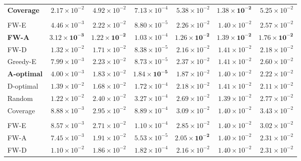\documentclass[letterpaper, 9
 pt, conference]{ieeeconf}
\begin{document}
\begin{table}[ht]
\begin{tabular}{lrrrrrr}
\textbf{Coverage} & $2.17\!\times\!10^{-2}$ & $4.92\!\times\!10^{-2}$ & $7.13\!\times\!10^{-4}$ & $5.38\!\times\!10^{-2}$ & $\mathbf{1.38\!\times\!10^{-2}}$ & $5.25\!\times\!10^{-2}$ \\
\addlinespace[1pt]
\multicolumn{7}{l}{\textit{$K{=}30$}} \\[1pt]
FW-E & $4.46\!\times\!10^{-3}$ & $2.22\!\times\!10^{-2}$ & $8.80\!\times\!10^{-5}$ & $2.26\!\times\!10^{-2}$ & $1.40\!\times\!10^{-2}$ & $2.57\!\times\!10^{-2}$ \\
\textbf{FW-A} & $\mathbf{3.12\!\times\!10^{-3}}$ & $\mathbf{1.22\!\times\!10^{-2}}$ & $1.03\!\times\!10^{-4}$ & $\mathbf{1.26\!\times\!10^{-2}}$ & $\mathbf{1.39\!\times\!10^{-2}}$ & $\mathbf{1.76\!\times\!10^{-2}}$ \\
FW-D & $1.32\!\times\!10^{-2}$ & $1.71\!\times\!10^{-2}$ & $8.38\!\times\!10^{-5}$ & $2.16\!\times\!10^{-2}$ & $1.41\!\times\!10^{-2}$ & $2.18\!\times\!10^{-2}$ \\
Greedy-E & $7.99\!\times\!10^{-3}$ & $2.23\!\times\!10^{-2}$ & $8.73\!\times\!10^{-5}$ & $2.37\!\times\!10^{-2}$ & $1.41\!\times\!10^{-2}$ & $2.60\!\times\!10^{-2}$ \\
\textbf{A-optimal} & $4.00\!\times\!10^{-3}$ & $1.83\!\times\!10^{-2}$ & $\mathbf{1.84\!\times\!10^{-5}}$ & $1.87\!\times\!10^{-2}$ & $1.40\!\times\!10^{-2}$ & $2.22\!\times\!10^{-2}$ \\
D-optimal & $1.39\!\times\!10^{-2}$ & $1.68\!\times\!10^{-2}$ & $1.72\!\times\!10^{-4}$ & $2.18\!\times\!10^{-2}$ & $1.41\!\times\!10^{-2}$ & $2.11\!\times\!10^{-2}$ \\
Random & $1.22\!\times\!10^{-2}$ & $2.40\!\times\!10^{-2}$ & $3.27\!\times\!10^{-4}$ & $2.69\!\times\!10^{-2}$ & $1.39\!\times\!10^{-2}$ & $2.77\!\times\!10^{-2}$ \\
Coverage & $8.88\!\times\!10^{-3}$ & $2.95\!\times\!10^{-2}$ & $8.89\!\times\!10^{-4}$ & $3.09\!\times\!10^{-2}$ & $1.40\!\times\!10^{-2}$ & $3.43\!\times\!10^{-2}$ \\
\addlinespace[1pt]
\multicolumn{7}{l}{\textit{$K{=}40$}} \\[1pt]
FW-E & $8.57\!\times\!10^{-3}$ & $2.71\!\times\!10^{-2}$ & $1.10\!\times\!10^{-4}$ & $2.85\!\times\!10^{-2}$ & $1.40\!\times\!10^{-2}$ & $3.02\!\times\!10^{-2}$ \\
FW-A & $7.45\!\times\!10^{-3}$ & $1.91\!\times\!10^{-2}$ & $5.53\!\times\!10^{-5}$ & $\mathbf{2.05\!\times\!10^{-2}}$ & $1.40\!\times\!10^{-2}$ & $2.31\!\times\!10^{-2}$ \\
FW-D & $1.10\!\times\!10^{-2}$ & $1.86\!\times\!10^{-2}$ & $1.82\!\times\!10^{-4}$ & $2.16\!\times\!10^{-2}$ & $1.40\!\times\!10^{-2}$ & $2.31\!\times\!10^{-2}$ \\

\end{tabular}
\end{table}
\end{document}
